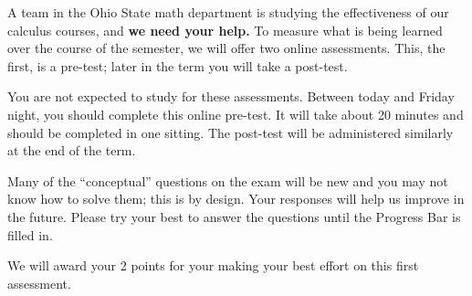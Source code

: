 \documentclass{ximera}
\begin{document}
A team in the Ohio State math department is studying the effectiveness
of our calculus courses, and \textbf{we need your help.}  To measure
what is being learned over the course of the semester, we will offer
two online assessments.  This, the first, is a pre-test; later in the
term you will take a post-test.

You are not expected to study for these assessments.  Between today
and Friday night, you should complete this online pre-test.  It will
take about 20 minutes and should be completed in one sitting.  The
post-test will be administered similarly at the end of the term.

Many of the ``conceptual'' questions on the exam will be new and you
may not know how to solve them; this is by design.  Your responses
will help us improve in the future.  Please try your best to answer
the questions until the Progress Bar is filled in.

We will award your 2 points for your making your best effort on this
first assessment.
\end{document}
